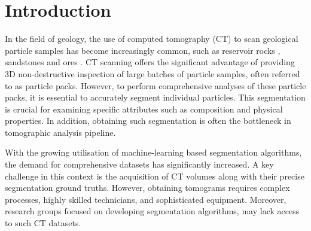 \documentclass[preprint,12pt]{elsarticle}
\begin{document}

\section{Introduction} \label{sec:introduction}



In the field of geology, the use of computed tomography (CT) to scan geological particle samples has become increasingly common, such as reservoir rocks \cite{VANGEET200025}, sandstones \cite{cnudde20123d} and ores \cite{warlo2021multi}.
CT scanning offers the significant advantage of providing 3D non-destructive inspection of large batches of particle samples, often referred to as particle packs.
However, to perform comprehensive analyses of these particle packs, it is essential to accurately segment individual particles. 
This segmentation is crucial for examining specific attributes such as composition and physical properties.
In addition, obtaining such segmentation is often the bottleneck in tomographic analysis pipeline.

With the growing utilisation of machine-learning based segmentation algorithms, the demand for comprehensive datasets has significantly increased. 
A key challenge in this context is the acquisition of CT volumes along with their precise segmentation ground truths. 
However, obtaining tomograms requires complex processes, highly skilled technicians, and sophisticated equipment. %
Moreover, research groups focused on developing segmentation algorithms, may lack access to such CT datasets. 
\end{document}
